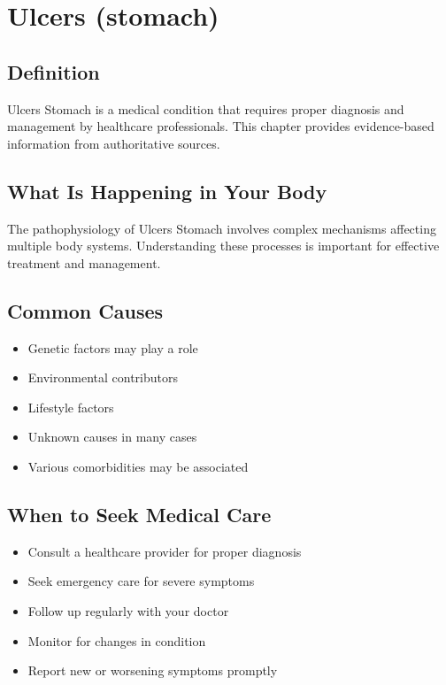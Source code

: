 
\chapter{Ulcers (stomach)}

\section*{Definition}
Ulcers Stomach is a medical condition that requires proper diagnosis and management by healthcare professionals. This chapter provides evidence-based information from authoritative sources.

\section*{What Is Happening in Your Body}
The pathophysiology of Ulcers Stomach involves complex mechanisms affecting multiple body systems. Understanding these processes is important for effective treatment and management.

\section*{Common Causes}
\begin{itemize}
  \item Genetic factors may play a role
  \item Environmental contributors
  \item Lifestyle factors
  \item Unknown causes in many cases
  \item Various comorbidities may be associated
\end{itemize}

\section*{When to Seek Medical Care}
\begin{itemize}
  \item Consult a healthcare provider for proper diagnosis
  \item Seek emergency care for severe symptoms
  \item Follow up regularly with your doctor
  \item Monitor for changes in condition
  \item Report new or worsening symptoms promptly
\end{itemize}

